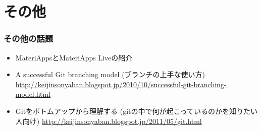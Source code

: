 \section{その他}

\begin{frame}
  \frametitle{その他の話題}
  \begin{itemize}
    \setlength{\itemsep}{1em}
  \item MateriAppsとMateriApps Liveの紹介
  \item A successful Git branching model (ブランチの上手な使い方) \url{http://keijinsonyaban.blogspot.jp/2010/10/successful-git-branching-model.html}
  \item Gitをボトムアップから理解する (gitの中で何が起こっているのかを知りたい人向け) 
    \url{http://keijinsonyaban.blogspot.jp/2011/05/git.html}
  \end{itemize}
\end{frame}


